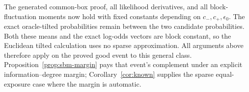 The generated common-box proof, all likelihood derivatives, and all
block-fluctuation moments now hold with fixed constants depending on
$c_-,c_+,\epsilon_0$. The exact oracle-tilted probabilities remain
between the two candidate probabilities. Both these means and the exact
log-odds vectors are block constant, so the Euclidean tilted calculation
uses no sparse approximation. All arguments above therefore apply on
the proved good event to this general class. Proposition~\ref{prop:sbm-margin}
pays that event's complement under an explicit information--degree
margin; Corollary~\ref{cor:known} supplies the sparse equal-exposure
case where the margin is automatic.

